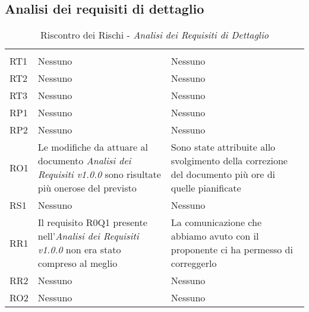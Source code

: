 \subsection{Analisi dei requisiti di dettaglio}
\begin{table}[H]
	\centering
	\begin{tabular}{|C{2.5cm}|C{5cm}|C{5cm}|}
		 & & \\
		RT1  & Nessuno & Nessuno \\
		\hline
		RT2  & Nessuno & Nessuno \\
		\hline
		RT3  & Nessuno & Nessuno \\
		\hline
		RP1  & Nessuno & Nessuno \\
		\hline
		RP2  & Nessuno & Nessuno \\
		\hline
		RO1  & Le modifiche da attuare al documento \textit{Analisi dei Requisiti v1.0.0} sono risultate più onerose del previsto & Sono state attribuite allo svolgimento della correzione del documento più ore di quelle pianificate \\
		\hline
		RS1  & Nessuno & Nessuno \\
		\hline
		RR1  & Il requisito R0Q1 presente nell'\textit{Analisi dei Requisiti v1.0.0} non era stato compreso al meglio  & La comunicazione che abbiamo avuto con il proponente ci ha permesso di correggerlo \\
		\hline
		RR2  & Nessuno & Nessuno \\
		\hline
		RO2  & Nessuno & Nessuno \\
		\hline
	\end{tabular}
	\caption{Riscontro dei Rischi - \textit{Analisi dei Requisiti di Dettaglio}}
\end{table}

